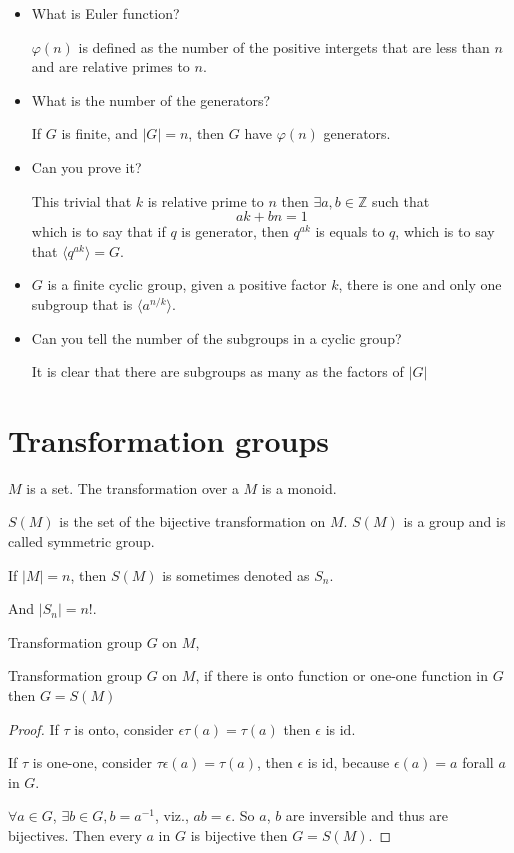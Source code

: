 \documentclass[../main.tex]{subfiles}
\begin{document}
\begin{itemize}
\item  What is Euler function? 

\( \varphi (n)\) is defined as the number of the positive intergets that are less than \(n\) and are relative primes to \(n\).
\item 
What is the number of the generators? 

If \(G\) is finite, and \(\vert G \vert = n\), then \(G\) 
have \( \varphi (n)\) generators. 

\item 
Can you prove it? 

This trivial that \(k\) is relative prime to \(n\) then \(\exists a , b  \in \mathbb{Z}\) such that 
\[
a k + b n  = 1
\]
which is to say that if \(q\) is generator, then \( q ^{ ak}\) is equals to \(q\), which is to say that \(\langle q ^{ak} \rangle = G\). 
\item  
	\(G\) is a finite cyclic group, given a positive factor \(k\), there is one and only one subgroup that is \( \langle a ^{n / k} \rangle\).
\item Can you tell the number of the subgroups in a cyclic group?

It is clear that there are subgroups as many as the factors of 
\(\vert G \vert\)
\end{itemize}

\section{Transformation groups}
\label{sec:Transformation groups}

\(M\) is a set. The transformation over a \(M\) is a monoid.

\(S (M)\) is the set of the bijective transformation on \(M\). \(S (M)\) is a group and is called symmetric group.

If \(|M| = n\), then \(S (M)\) is sometimes denoted as \( S_{n}\). 

And \(|S _{n}|  = n !\).  

Transformation group \(G\) on \(M\), 

\begin{thm}
	Transformation group \(G\) on \(M\), if there is onto function or one-one function in \(G\) then \(G = S(M)\)
\end{thm}

\begin{proof}
	If \(\tau \) is onto, consider \( \epsilon \tau(a) =  \tau (a)\) then \(\epsilon\) is \( \text{id}\). 

	If \( \tau\) is one-one, consider \(\tau\epsilon (a) =\tau (a)\), then \(\epsilon\) is \( \text{id}\), because \(\epsilon (a) = a\) forall \(a\) in \(G\). 

	\(\forall a \in G\), \( \exists b \in G , b = a ^{-1}\), viz., \( a b =\epsilon\). So \(a\), \(b\) are inversible and thus are
	bijectives. Then every \(a\) in \(G\) is bijective then 
	\(G  = S (M)\). 
\end{proof} 
\end{document}

